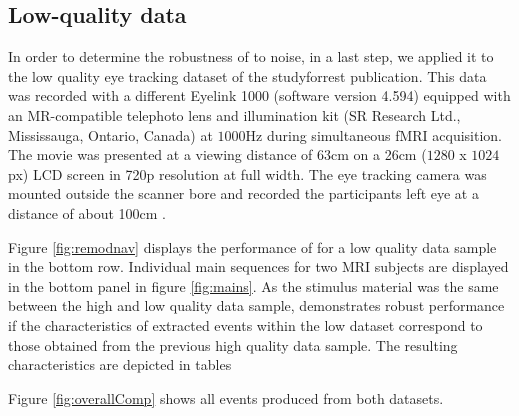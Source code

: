     \subsection*{Low-quality data}\label{ana_3}

    In order to determine the robustness of \remodnav to noise, in a last step, we applied it to the low quality eye
    tracking dataset of the studyforrest publication. This data was recorded with a different Eyelink 1000 (software
    version 4.594) equipped with an MR-compatible telephoto lens and illumination kit (SR Research Ltd., Mississauga,
    Ontario, Canada) at $1000$Hz during simultaneous fMRI acquisition. The movie was presented at a viewing distance
    of $63$cm on a 26cm ($1280$ x $1024$px) LCD screen in 720p resolution at full width. The eye tracking camera was
    mounted outside the scanner bore and recorded the participants left eye at a distance of about 100cm \citep{Hanke2016}.

    Figure \ref{fig:remodnav} displays the performance of \remodnav for a low quality data sample in the bottom row.
    Individual main sequences for two MRI subjects are displayed in the bottom panel in figure \ref{fig:mains}. As the
    stimulus material was the same between the high and low quality data sample, \remodnav demonstrates robust
    performance if the characteristics of extracted events within the low dataset correspond to those obtained from the
    previous high quality data sample. The resulting characteristics are depicted in tables 

    Figure \ref{fig:overallComp} shows all events produced from both datasets.

